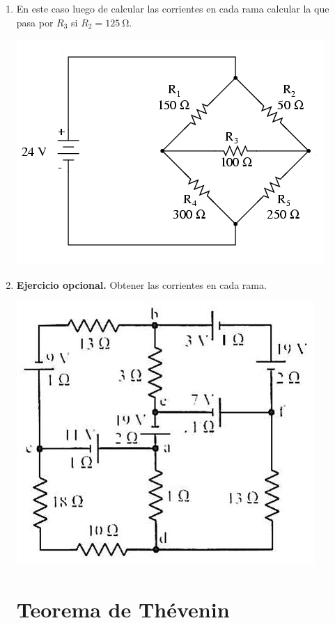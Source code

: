 \documentclass[11pt,spanish,a4paper]{article}
\begin{document}
\begin{enumerate}
\item
    En este caso luego de calcular las corrientes en cada rama calcular la que pasa por \(R_3\) si \(R_2=\SI{125}{\ohm}\).

    \begin{center}
    \includegraphics[width=0.5 \textwidth]{wheatstone}
    \end{center}


\item \textbf{Ejercicio opcional.} Obtener las corrientes en cada rama.

    \begin{center}
    \includegraphics[width=0.45 \textwidth]{Circuitos_electricos_3}
    \end{center}



\section*{Teorema de Thévenin}


\end{enumerate}
\end{document}
